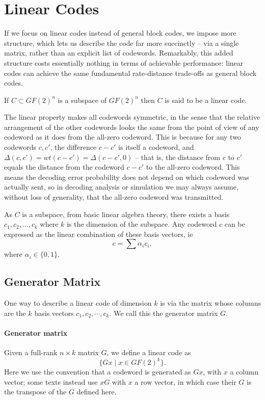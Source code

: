 \section{Linear Codes}
If we focus on linear codes instead of general block codes, we impose more structure, which lets us describe the code far more succinctly -- via a single matrix, rather than an explicit list of codewords. Remarkably, this added structure costs essentially nothing in terms of achievable performance: linear codes can achieve the same fundamental rate-distance trade-offs as general block codes. 

\begin{definition}
If \(C \subset GF(2)^n\) is a subspace of \(GF(2)^n\) then \(C\) is said to be a linear code.
\end{definition}

The linear property makes all codewords symmetric, in the sense that the relative arrangement of the other codewords looks the same from the point of view of any codeword as it does from the all-zero codeword. This is because for any two codewords \(c, c'\), the difference \(c - c'\) is itself a codeword, and \(\Delta(c,c') = wt(c-c') = \Delta(c-c', 0)\) -- that is, the distance from \(c\) to \(c'\) equals the distance from the codeword \(c-c'\) to the all-zero codeword. This means the decoding error probability does not depend on which codeword was actually sent, so in decoding analysis or simulation we may always assume, without loss of generality, that the all-zero codeword was transmitted.


As \(C\) is a subspace, from basic linear algebra theory, there exists a basis \(c_1, c_2, \ldots, c_k\) where \(k\) is the dimension of the subspace. Any codeword \(c\) can be expressed as the linear combination of these basis vectors, ie 
\[c = \sum \alpha_i c_i, \]
where \(\alpha_i \in \{0,1\}.\) 


\subsection{Generator Matrix}
One way to describe a linear code of dimension \(k\) is via the matrix whose columns are the \(k\) basis vectors \(c_1, c_2, \cdots, c_k\). We call this the generator matrix \(G\). 

\paragraph{Generator matrix} Given a full-rank \(n \times k\) matrix \(G\), we define a linear code as
\[ \{Gx \;|\; x \in GF(2)^k \}.\]
 Here we use the convention that a codeword is generated as \(Gx\), with \(x\) a column vector; some texts instead use \(xG\) with \(x\) a row vector, in which case their \(G\) is the transpose of the \(G\) defined here.

